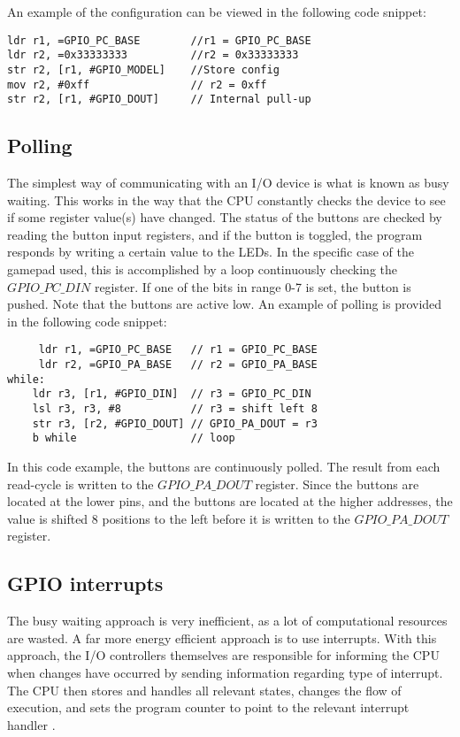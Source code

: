 An example of the configuration can be viewed in the following code snippet: 

\begin{lstlisting}
ldr r1, =GPIO_PC_BASE        //r1 = GPIO_PC_BASE
ldr r2, =0x33333333          //r2 = 0x33333333  
str r2, [r1, #GPIO_MODEL]    //Store config
mov r2, #0xff                // r2 = 0xff
str r2, [r1, #GPIO_DOUT]     // Internal pull-up

\end{lstlisting}





\subsection{Polling}\label{ch:polling}
The simplest way of communicating with an I/O device is what is known as busy waiting\cite[p. 99]{wolf}. This works in the way that the CPU constantly checks the device to see if some register value(s) have changed. The status of the buttons are checked by reading the button input registers, and if the button is toggled, the program responds by writing a certain value to the LEDs. In the specific case of the gamepad used, this is accomplished by a loop continuously checking the $GPIO\_PC\_DIN$ register. If one of the bits in range 0-7 is set, the button is pushed. Note that the buttons are active low. An example of polling is provided in the following code snippet:

\begin{lstlisting}
     ldr r1, =GPIO_PC_BASE   // r1 = GPIO_PC_BASE
     ldr r2, =GPIO_PA_BASE   // r2 = GPIO_PA_BASE
while:
    ldr r3, [r1, #GPIO_DIN]  // r3 = GPIO_PC_DIN
    lsl r3, r3, #8           // r3 = shift left 8  
    str r3, [r2, #GPIO_DOUT] // GPIO_PA_DOUT = r3
    b while                  // loop
\end{lstlisting}

In this code example, the buttons are continuously polled. The result from each read-cycle is written to the $GPIO\_PA\_DOUT$ register. Since the buttons are located at the lower pins, and the buttons are located at the higher addresses, the value is shifted 8 positions to the left before it is written to the $GPIO\_PA\_DOUT$ register. 

\subsection{GPIO interrupts}\label{ch:interrupts}
The busy waiting approach is very inefficient, as a lot of computational resources are wasted. A far more energy efficient approach is to use interrupts. With this approach, the I/O controllers themselves are responsible for informing the CPU when changes have occurred by sending information regarding type of interrupt. The CPU then stores and handles all relevant states, changes the flow of execution, and sets the program counter to point to the relevant interrupt handler \cite[p. 86]{wolf}.

